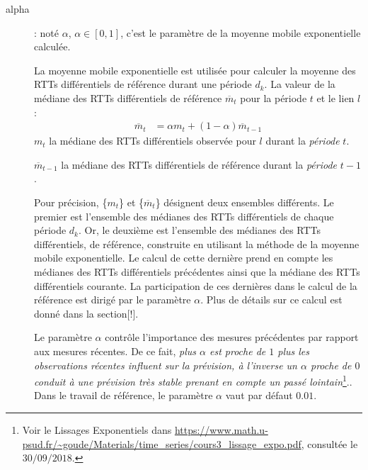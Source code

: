 \begin{description}
	\item[alpha ]: noté $\alpha$,  $\alpha \in [0, 1]$, c'est le paramètre de la  moyenne mobile exponentielle calculée.
	
	La  moyenne mobile exponentielle est utilisée pour calculer la moyenne des RTTs différentiels de référence durant une période $d_k$.
	La  valeur de la médiane des RTTs différentiels de référence $ \overline{m}_{t}$   pour la période $ t $ et  le lien $l$ :
	\begin{align*}
	\overline{m}_{t} &=  \alpha{m}_{t} + (1 -  \alpha)  \overline{m}_{t-1}
	\end{align*} 
	$m_t$ la médiane des RTTs différentiels observée pour $l$ durant la \textit{période} $t$. 
	
	$ \overline{m}_{t-1}$  la médiane des  RTTs différentiels  de référence durant la \textit{période} $ t-1 $.  
	
	
	
	Pour précision, \{$m_t$\} et \{$ \overline{m}_{t}$\} désignent deux ensembles différents.   Le premier est l'ensemble des médianes des RTTs différentiels de chaque période $d_k$. Or, le deuxième est l'ensemble des médianes des RTTs différentiels, de référence, construite en utilisant la méthode de la moyenne mobile exponentielle. Le calcul de cette dernière prend en compte les médianes des RTTs différentiels précédentes ainsi que la médiane des RTTs différentiels courante. La participation de ces dernières dans le calcul de la référence est dirigé par le paramètre $\alpha$. Plus de détails sur ce calcul est donné dans la section[!]. 
	
	
	
	Le paramètre $\alpha$  contrôle l'importance  des mesures précédentes par rapport aux mesures récentes. De ce fait, \guillemotleft \textit{plus $\alpha$ est proche de $ 1 $ plus les observations récentes influent sur la prévision, à l'inverse un $\alpha$ proche de $0$ conduit à une prévision très stable prenant en compte un passé lointain}\footnote{Voir le Lissages Exponentiels dans \url{https://www.math.u-psud.fr/~goude/Materials/time_series/cours3_lissage_expo.pdf}, consultée le $30/09/2018$.}.\guillemotright.  Dans le travail de référence, le paramètre $\alpha$  vaut par défaut $0.01$.
	

\end{description}
